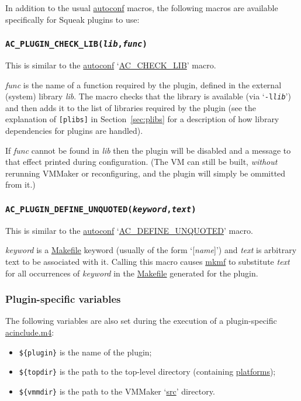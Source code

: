 \documentclass{article}
\newcommand{\cmd}{\url}
\newcommand{\cmd}{\texttt}
\begin{document}
In addition to the usual \cmd{autoconf} macros, the following
macros
are available specifically for Squeak plugins to use:

\subsubsection{\texttt{AC\_PLUGIN\_CHECK\_LIB(\emph{lib},\emph{func})}}

This is similar to the \cmd{autoconf} `\cmd{AC_CHECK_LIB}' macro.

\emph{func} is the name of a function required by the plugin, defined
in the external (system) library \emph{lib}.  The macro checks that
the library is available (via `\texttt{-l\emph{lib}}') and then adds it
to the list of libraries required by the plugin (see the explanation
of \texttt{[plibs]} in Section~\ref{sec:plibs} for a description of
how library dependencies for plugins are handled).

If \emph{func} cannot be found in \emph{lib} then the plugin will be
disabled and a message to that effect printed during configuration.
(The VM can still be built, \emph{without} rerunning VMMaker or
reconfiguring, and the plugin will simply be ommitted from it.)


\subsubsection{\texttt{AC\_PLUGIN\_DEFINE\_UNQUOTED(\emph{keyword},\emph{text})}}

This
is similar to the \cmd{autoconf} `\cmd{AC_DEFINE_UNQUOTED}' macro.

\emph{keyword} is a \cmd{Makefile} keyword (usually of the form
`[\emph{name}]') and \emph{text} is arbitrary text to be
associated with it.  Calling this macro causes \cmd{mkmf} to
substitute \emph{text} for all occurrences of \emph{keyword} in the
\cmd{Makefile} generated for the plugin.

\subsubsection{Plugin-specific variables}

The following variables are also set during the execution of a
plugin-specific \cmd{acinclude.m4}:

\begin{itemize}
\item[] \texttt{\$\{plugin\}} is the name of the plugin;
\item[] \texttt{\$\{topdir\}} is the path to the top-level directory (containing
  \cmd{platforms});
\item[] \texttt{\$\{vmmdir\}} is the path to the VMMaker `\cmd{src}' directory.
\end{itemize}
\end{document}
